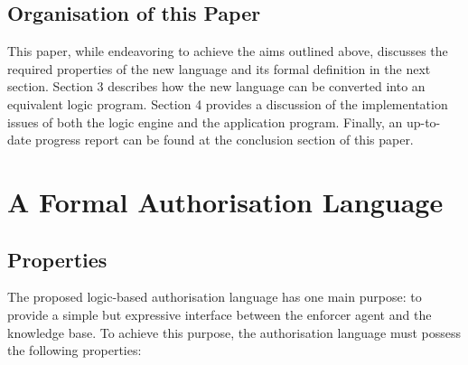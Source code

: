 \documentclass[a4paper,draft]{article}
\begin{document}
    \subsection{Organisation of this Paper}

      This paper, while endeavoring to achieve the aims outlined above,
      discusses the required properties of the new language and its formal
      definition in the next section. Section 3 describes how the new language
      can be converted into an equivalent logic program. Section 4 provides
      a discussion of the implementation issues of both the logic engine and
      the application program. Finally, an up-to-date progress report can be
      found at the conclusion section of this paper.

    \pagebreak

  \section{A Formal Authorisation Language}

    \subsection{Properties}

      The proposed logic-based authorisation language has one main purpose:
      to provide a simple but expressive interface between the enforcer
      agent and the knowledge base. To achieve this purpose, the authorisation
      language must possess the following properties:
\end{document}
